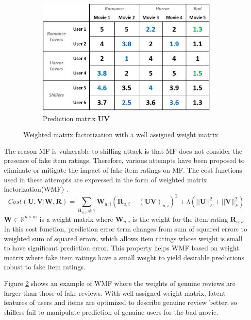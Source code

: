 \documentclass[master,english,final]{kaist-ucs}
\begin{document}
\begin{figure}[b]
\begin{subfigure}[b]{0.3\textwidth}
        \centering
        \includegraphics[width=\textwidth]{figure/wmf_good_prediction}
        \caption{Prediction matrix $\bm{UV}$}
        \label{wmf_good_prediction}
    \end{subfigure}
    \caption{Weighted matrix factorization with a well assigned weight matrix}
    \label{wmf_good}
\end{figure}
The reason MF is vulnerable to shilling attack is that MF does not consider the presence of fake item ratings.
Therefore, various attempts have been proposed to eliminate or mitigate the impact of fake item ratings on MF.
The cost functions used in these attempts are expressed in the form of weighted matrix factorization(WMF) \cite{ImplicitCF}.
\begin{equation}
Cost(\bm{U},\bm{V} | \bm{W}, \bm{R})=\sum_{\bm{R}_{u,i} \neq ?} \bm{W}_{u,i}(  \bm{R}_{u,i} - (\bm{UV})_{u,i} )^2 + \lambda(||\bm{U}||_F^2+||\bm{V}||_F^2)
\end{equation}
$\bm{W} \in \mathbb{R}^{n \times m}$ is a weight matrix where $\bm{W}_{u,i}$ is the weight for the item rating $\bm{R}_{u,i}$.
In this cost function, prediction error term changes from sum of squared errors to weighted sum of squared errors, which allows item ratings whose weight is small to have significant prediction error.
This property helps WMF based on weight matrix where fake item ratings have a small weight to yield desirable predictions robust to fake item ratings.

Figure \ref{wmf_good} shows an example of WMF where the weights of genuine reviews are larger than those of fake reviews.
With well-assigned weight matrix, latent features of users and items are optimized to describe genuine review better, so shillers fail to manipulate prediction of genuine users for the bad movie.
\end{document}
